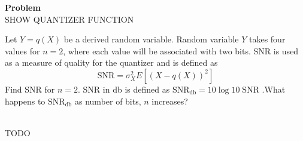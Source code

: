 \documentclass[12pt]{article}
\newenvironment{Ex}{\textbf{Problem}\vspace{.75em}\\}{}
\begin{document}
\begin{enumerate}
\begin{Ex}
    {\color{red} \huge SHOW QUANTIZER FUNCTION}

    Let $Y = q(X)$ be a derived random variable. Random variable $Y$
    takes four values for $n = 2$, where each value will be associated
    with two bits. SNR is used as a measure of quality for the
    quantizer and is defined as $$\text{SNR} = \sigma_X^2
    E[(X−q(X))^2]$$ Find SNR for $n=2$. SNR in db is defined as
    $\text{SNR}_{\text{db}} = 10\log 10\;\text{SNR}$ .What happens to
    $\text{SNR}_{\text{db}}$ as number of bits, $n$ increases?

    \begin{solution} \hfill \vspace{.75em} \\
      {\color{red} \huge TODO}
    \end{solution}
  \end{Ex}

\end{enumerate}
\end{document}
